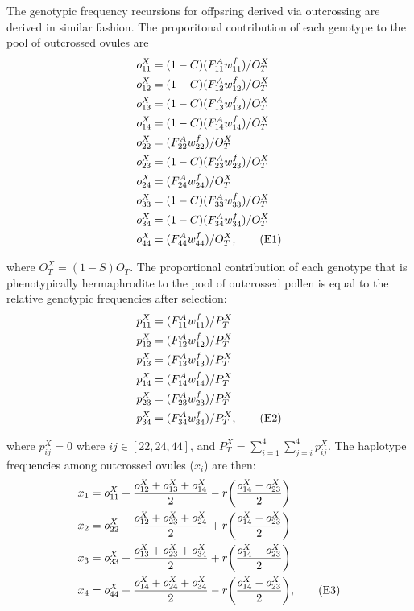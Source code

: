 \documentclass{article}
\newcommand\numberthis{\addtocounter{equation}{1}\tag{\theequation}}
\begin{document}
The genotypic frequency recursions for offpsring derived via outcrossing are derived in similar fashion. The proporitonal contribution of each genotype to the pool of outcrossed ovules are
\begin{align*}
    o^X_{11} &= (1 - C) (F^A_{11} w^f_{11})/O^X_T \\
    o^X_{12} &= (1 - C) (F^A_{12} w^f_{12})/O^X_T \\
    o^X_{13} &= (1 - C) (F^A_{13} w^f_{13})/O^X_T \\
    o^X_{14} &= (1 - C) (F^A_{14} w^f_{14})/O^X_T \\
    o^X_{22} &= (F^A_{22} w^f_{22})/O^X_T \\
    o^X_{23} &= (1 - C) (F^A_{23} w^f_{23})/O^X_T \\
    o^X_{24} &= (F^A_{24} w^f_{24})/O^X_T \\
    o^X_{33} &= (1 - C) (F^A_{33} w^f_{33})/O^X_T \\
    o^X_{34} &= (1 - C) (F^A_{34} w^f_{34})/O^X_T \\
    o^X_{44} &= (F^A_{44} w^f_{44})/O^X_T, \numberthis
\end{align*}

\noindent where $O^X_T = (1 - S)O_T$. The proportional contribution of each genotype that is phenotypically hermaphrodite to the pool of outcrossed pollen is equal to the relative genotypic frequencies after selection:
\begin{align*}
    p^X_{11} &= (F^A_{11} w^f_{11}) / P^X_T \\
    p^X_{12} &= (F^A_{12} w^f_{12}) / P^X_T \\
    p^X_{13} &= (F^A_{13} w^f_{13}) / P^X_T \\
    p^X_{14} &= (F^A_{14} w^f_{14}) / P^X_T \\
    p^X_{23} &= (F^A_{23} w^f_{23}) / P^X_T \\
    p^X_{34} &= (F^A_{34} w^f_{34}) / P^X_T, \numberthis
\end{align*}

\noindent where $p^X_{ij} = 0$ where $ij \in [22,24,44]$, and $P^X_T = \sum_{i=1}^{4}\sum_{j=i}^{4} p^X_{ij}$. The haplotype frequencies among outcrossed ovules ($x_i$) are then:
\begin{align*} 
    x_{1} &= o^X_{11} + \frac{o^X_{12} + o^X_{13} + o^X_{14}}{2} - r \bigg( \frac{o^X_{14} - o^X_{23}}{2} \bigg)  \\
    x_{2} &= o^X_{22} + \frac{o^X_{12} + o^X_{23} + o^X_{24}}{2} + r \bigg( \frac{o^X_{14} - o^X_{23}}{2} \bigg)  \\
    x_{3} &= o^X_{33} + \frac{o^X_{13} + o^X_{23} + o^X_{34}}{2} + r \bigg( \frac{o^X_{14} - o^X_{23}}{2} \bigg)  \\
    x_{4} &= o^X_{44} + \frac{o^X_{14} + o^X_{24} + o^X_{34}}{2} - r \bigg( \frac{o^X_{14} - o^X_{23}}{2} \bigg),  \numberthis
\end{align*}
\end{document}
